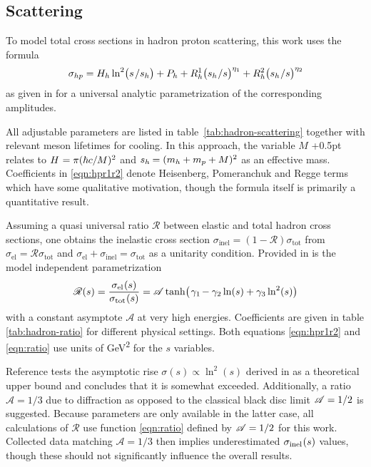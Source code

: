 \subsection*{Scattering}

To model total cross sections in hadron proton scattering, this work uses the formula
\begin{equation}
	\sigma_{hp} = H_h \ln^2 \bigl( s \kern+1.0pt / s_h \bigr) + P_h +
	R_h^1 \bigl( s_h \kern+0.5pt / s \bigr)^{\eta_1} + R_h^2 \bigl( s_h \kern+0.5pt / s \bigr)^{\eta_2}
	\label{eqn:hpr1r2}
\end{equation}
as given in \cite{Belousov_2016} for a universal analytic parametrization of the corresponding amplitudes.

All adjustable parameters are listed in table~\ref{tab:hadron-scattering} together with relevant meson lifetimes for
cooling. In this approach, the variable $M$ \kern+0.5pt relates to $H \kern+0.5pt = \pi (\hbar c / M)^2$ and
$s_h \kern-0.5pt = (m_h + m_p + M)^2$ as an effective mass. Coefficients in \eqref{eqn:hpr1r2} denote Heisenberg,
Pomeranchuk and Regge terms which have some qualitative motivation, though the formula itself is primarily a quantitative
result.



Assuming a quasi universal ratio $\mathscr{R}$ between elastic and total hadron cross sections, one obtains the inelastic
cross section $\sigma_\text{inel} = (1 - \mathscr{R}) \sigma_\text{tot}$ from $\sigma_\text{el} = \mathscr{R} \sigma_\text{tot}$
and $\sigma_\text{el} + \sigma_\text{inel} = \sigma_\text{tot}$ as a unitarity condition. Provided in \cite{Fagundes_2012} is
the model independent parametrization
\begin{equation}
	\mathscr{R}(s) = \frac{\sigma_{\text{el}\kern+0.5pt} (s)}{\sigma_{\text{tot}\kern+0.5pt} (s)} =
	\mathscr{A} \tanh \bigl( \kern+1.0pt \gamma_1 \kern-1.0pt - \gamma_2 \ln (s) + \gamma_3 \ln^2 (s) \bigr)
	\label{eqn:ratio}
\end{equation}
with a constant asymptote $\mathscr{A}$ at very high energies. Coefficients are given in table \ref{tab:hadron-ratio} for
different physical settings. Both equations \eqref{eqn:hpr1r2} and \eqref{eqn:ratio} use units of \unit{\giga\electronvolt\squared}
for the $s$  variables.



Reference \cite{Fagundes_2013} tests the asymptotic rise $\sigma(s) \propto \ln^2(s)$ derived in \cite{Froissart_1961} as
a theoretical upper bound and concludes that it is somewhat exceeded. Additionally, a ratio $\mathscr{A} = 1/3$ due to
diffraction as opposed to the classical black disc limit $\mathscr{A} = 1/2 \kern+0.2pt$ is suggested. Because parameters
are only available in the latter case, all calculations of $\mathscr{R}$ use function \eqref{eqn:ratio} defined by
$\mathscr{A} = 1/2 \kern+0.2pt$ for this work. Collected data matching $\mathscr{A} = 1/3$ then implies underestimated
$\sigma_{\text{inel}\kern+0.5pt}(s)$ values, though these should not significantly influence the overall results.



